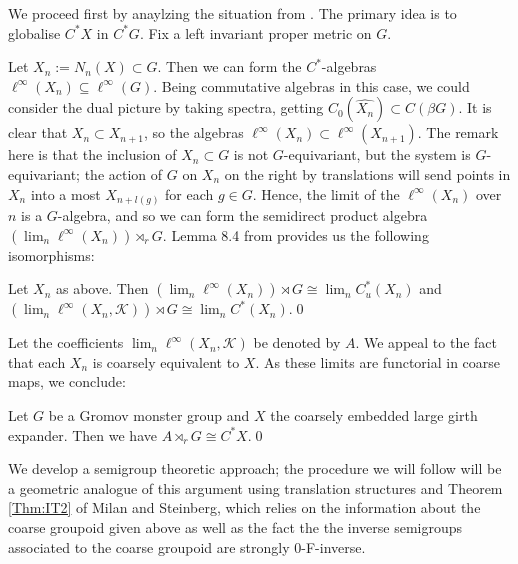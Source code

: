 \begin{example}
We proceed first by anaylzing the situation from \cite[Section 8]{explg1}. The primary idea is to globalise  $C^{*}X$ in $C^{*}G$. Fix a left invariant proper metric on $G$.

Let $X_{n}:=N_{n}(X)\subset G$. Then we can form the $C^{*}$-algebras $\ell^{\infty}(X_{n}) \subseteq \ell^{\infty}(G)$. Being commutative algebras in this case, we could consider the dual picture by taking spectra, getting $C_{0}(\widehat{X_{n}}) \subset C(\beta G)$. It is clear that $X_{n} \subset X_{n+1}$, so the algebras $\ell^{\infty}(X_{n}) \subset \ell^{\infty}(X_{n+1})$. The remark here is that the inclusion of $X_{n} \subset G$ is not $G$-equivariant, but the system is $G$-equivariant; the action of $G$ on $X_{n}$ on the right by translations will send points in $X_{n}$ into a most $X_{n+l(g)}$ for each $g \in G$. Hence, the limit of the $\ell^{\infty}(X_{n})$ over $n$ is a $G$-algebra, and so we can form the semidirect product algebra $(\lim_{n}\ell^{\infty}(X_{n}))\rtimes_{r} G$. Lemma 8.4 from \cite{explg1} provides us the following isomorphisms:

\begin{lemma}\label{lem:GMG}
Let $X_{n}$ as above. Then $(\lim_{n}\ell^{\infty}(X_{n}))\rtimes G \cong \lim_{n} C^{*}_{u}(X_{n})$ and $(\lim_{n}\ell^{\infty}(X_{n},\mathcal{K}))\rtimes G \cong \lim_{n} C^{*}(X_{n})$.\qed
\end{lemma}

Let the coefficients $\lim_{n}\ell^{\infty}(X_{n},\mathcal{K})$ be denoted by $A$. We appeal to the fact that each $X_{n}$ is coarsely equivalent to $X$. As these limits are functorial in coarse maps, we conclude:

\begin{proposition}
Let $G$ be a Gromov monster group and $X$ the coarsely embedded large girth expander. Then we have $A\rtimes_{r} G \cong C^{*}X$.\qed
\end{proposition}

We develop a semigroup theoretic approach; the procedure we will follow will be a geometric analogue of this argument using translation structures and Theorem \ref{Thm:IT2} of Milan and Steinberg, which relies on the information about the coarse groupoid given above as well as the fact the the inverse semigroups associated to the coarse groupoid are strongly 0-F-inverse.


\end{example}
